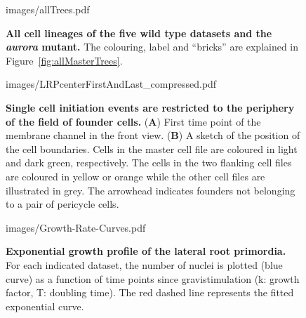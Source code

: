\documentclass[11pt,a4paper, final]{article}
\begin{document}
\clearpage
%
%
\begin{sidewaysfigure}
\centering
		\begin{overpic}[width=1.\linewidth]{images/allTrees.pdf}
		\end{overpic}
\caption[All cell lineages of the five wild type datasets and the \emph{aurora} mutant.]
{
{\bf All cell lineages of the five wild type datasets and the \emph{aurora} mutant.} The colouring, label and ``bricks'' are explained in Figure~\ref{fig:allMasterTrees}.
}
	\label{fig:allTrees}
\end{sidewaysfigure}
\clearpage
%
\begin{figure}[htbp]
\centering
	\begin{overpic}[width=0.5\linewidth]{images/LRPcenterFirstAndLast_compressed.pdf}
	\end{overpic}
\caption[Single cell initiation events are restricted to the periphery of the field of founder cells.]
{{\bf Single cell initiation events are restricted to the periphery of the field of founder cells.} (\textbf{A}) First time point of the membrane channel in the front view. (\textbf{B}) A sketch of the position of the cell boundaries. Cells in the master cell file are coloured in light and dark green, respectively. The cells in the two flanking cell files are coloured in yellow or orange while the other cell files are illustrated in grey. The arrowhead indicates founders not belonging to a pair of pericycle cells.}
	\label{fig:founderstop}
\end{figure}
%
\clearpage
%
%
\begin{figure}[htbp]
\centering
	\begin{overpic}[width=1.\linewidth]{images/Growth-Rate-Curves.pdf}
	\end{overpic}
\caption[Exponential growth profile of the lateral root primordia.]
{{\bf Exponential growth profile of the lateral root primordia.} For each indicated dataset, the number of nuclei is plotted (blue curve) as a function of time points since gravistimulation (k: growth factor, T: doubling time). The red dashed line represents the fitted exponential curve.}
	\label{fig:growthcurves}
\end{figure}
%
\end{document}
